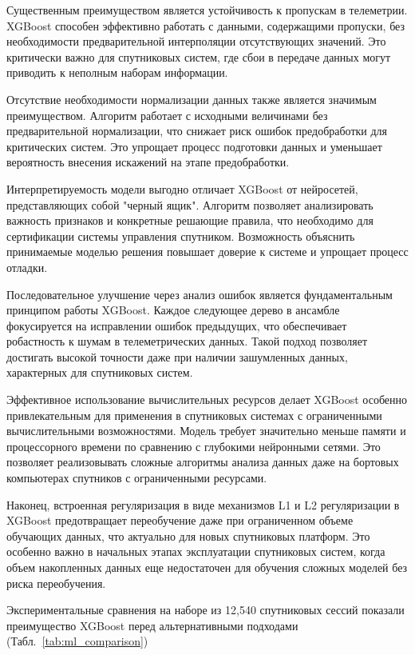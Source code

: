 Существенным преимуществом является устойчивость к пропускам в телеметрии.
XGBoost способен эффективно работать с данными, содержащими пропуски, без
необходимости предварительной интерполяции отсутствующих значений. Это
критически важно для спутниковых систем, где сбои в передаче данных могут
приводить к неполным наборам информации.

Отсутствие необходимости нормализации данных также является значимым
преимуществом. Алгоритм работает с исходными величинами без предварительной
нормализации, что снижает риск ошибок предобработки для критических систем. Это
упрощает процесс подготовки данных и уменьшает вероятность внесения искажений на
этапе предобработки.

Интерпретируемость модели выгодно отличает XGBoost от нейросетей, представляющих
собой "черный ящик". Алгоритм позволяет анализировать важность признаков и
конкретные решающие правила, что необходимо для сертификации системы управления
спутником. Возможность объяснить принимаемые моделью решения повышает доверие к
системе и упрощает процесс отладки.

Последовательное улучшение через анализ ошибок является фундаментальным
принципом работы XGBoost. Каждое следующее дерево в ансамбле фокусируется на
исправлении ошибок предыдущих, что обеспечивает робастность к шумам в
телеметрических данных. Такой подход позволяет достигать высокой точности даже
при наличии зашумленных данных, характерных для спутниковых систем.

Эффективное использование вычислительных ресурсов делает XGBoost особенно
привлекательным для применения в спутниковых системах с ограниченными
вычислительными возможностями. Модель требует значительно меньше памяти и
процессорного времени по сравнению с глубокими нейронными сетями. Это позволяет
реализовывать сложные алгоритмы анализа данных даже на бортовых компьютерах
спутников с ограниченными ресурсами.

Наконец, встроенная регуляризация в виде механизмов L1 и L2 регуляризации в
XGBoost предотвращает переобучение даже при ограниченном объеме обучающих
данных, что актуально для новых спутниковых платформ. Это особенно важно в
начальных этапах эксплуатации спутниковых систем, когда объем накопленных данных
еще недостаточен для обучения сложных моделей без риска переобучения.

Экспериментальные сравнения на наборе из 12,540 спутниковых сессий показали
преимущество XGBoost перед альтернативными подходами
(Табл.~\ref{tab:ml_comparison})

